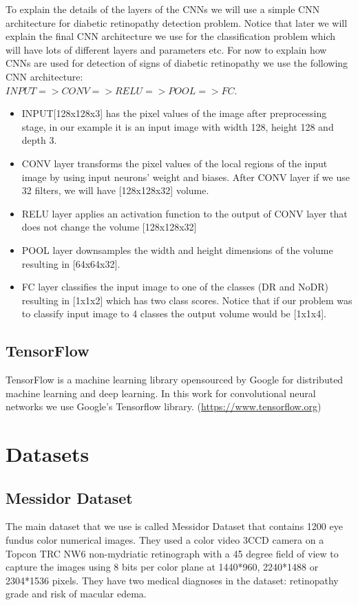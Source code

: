 To explain the details of the layers of the CNNs we will use a simple CNN architecture for diabetic retinopathy detection problem. Notice that later we will explain the final CNN architecture we use for the classification problem which will have lots of different layers and parameters etc. For now to explain how CNNs are used for detection of signs of diabetic retinopathy we use the following CNN architecture:\\ 
${INPUT => CONV => RELU => POOL => FC}$. 

\begin{itemize}
    \item INPUT[128x128x3] has the pixel values of the image after preprocessing stage, in our example it is an input image with width 128, height 128 and depth 3.
    \item CONV layer transforms the pixel values of the local regions of the input image by using input neurons' weight and biases. After CONV layer if we use 32 filters, we will have [128x128x32] volume.
    \item RELU layer applies an activation function to the output of CONV layer that does not change the volume [128x128x32]
    \item POOL layer downsamples the width and height dimensions of the volume resulting in [64x64x32].
    \item FC layer classifies the input image to one of the classes (DR and NoDR) resulting in [1x1x2] which has two class scores. Notice that if our problem was to classify input image to 4 classes the output volume would be [1x1x4].
\end{itemize}


\subsection{TensorFlow}
TensorFlow is a machine learning library opensourced by Google for distributed machine learning and deep learning. In this work for convolutional neural networks we use Google's Tensorflow library. (\url{https://www.tensorflow.org})

\section{Datasets}
\subsection{Messidor Dataset}
The main dataset that we use is called Messidor Dataset \citep{decenciere2014feedback} that contains 1200 eye fundus color numerical images. They used a color video 3CCD camera on a Topcon TRC NW6 non-mydriatic retinograph with a 45 degree field of view to capture the images using 8 bits per color plane at 1440*960, 2240*1488 or 2304*1536 pixels. 
They have two medical diagnoses in the dataset: retinopathy grade and risk of macular edema. 

